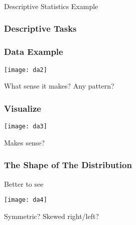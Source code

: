 \begin{frame}[fragile]\frametitle{}
\begin{center}
{\Large Descriptive Statistics Example}
\end{center}
\end{frame}


\begin{frame}[fragile] \frametitle{Descriptive Tasks}

\hfill
{}

\end{frame}



\begin{frame}[fragile]\frametitle{Data Example}	
\begin{center}
\texttt{[image: da2]}
\end{center}
What sense it makes?
Any pattern?


\end{frame}

\begin{frame}[fragile]\frametitle{Visualize}	
\begin{center}
\texttt{[image: da3]}
\end{center}
Makes sense?


\end{frame}

\begin{frame}[fragile]\frametitle{The Shape of The Distribution}	
Better to see
\begin{center}
\texttt{[image: da4]}
\end{center}
Symmetric? Skewed right/left?
\end{frame}
